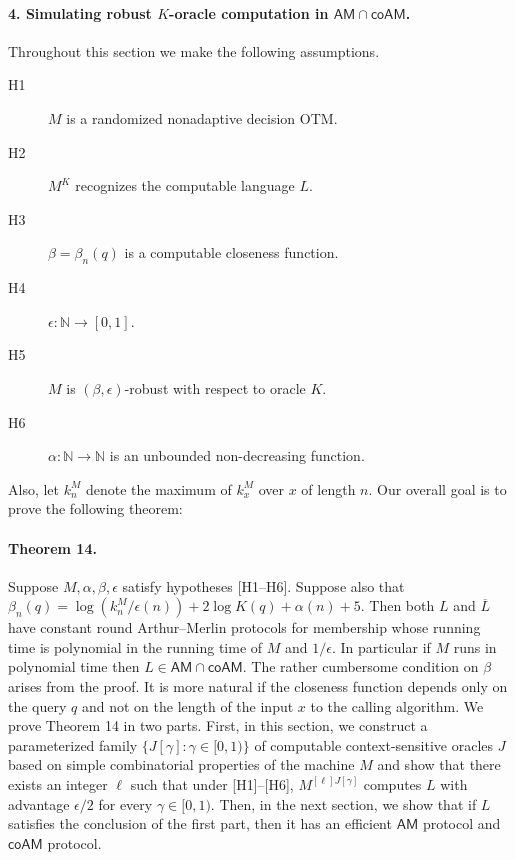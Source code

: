 \paragraph{4. Simulating robust $K$-oracle computation in $\mathsf{AM}\cap\mathsf{coAM}$.}
Throughout this section we make the following assumptions.
\begin{description}
\item[H1] $M$ is a randomized nonadaptive decision OTM.
\item[H2] $M^K$ recognizes the computable language $L$.
\item[H3] $\beta=\beta_n(q)$ is a computable closeness function.
\item[H4] $\epsilon:\mathbb N\to[0,1]$.
\item[H5] $M$ is $(\beta,\epsilon)$-robust with respect to oracle $K$.
\item[H6] $\alpha:\mathbb N\to\mathbb N$ is an unbounded non-decreasing function.
\end{description}
Also, let $k_n^M$ denote the maximum of $k_x^M$ over $x$ of length $n$.
Our overall goal is to prove the following theorem:
\paragraph{Theorem 14.}
Suppose $M,\alpha,\beta,\epsilon$ satisfy hypotheses [H1--H6]. Suppose also that $\beta_n(q)=\log(k_n^M/\epsilon(n))+2\log K(q)+\alpha(n)+5$. Then both $L$ and $\overline L$ have constant round Arthur--Merlin protocols for membership whose running time is polynomial in the running time of $M$ and $1/\epsilon$. In particular if $M$ runs in polynomial time then $L\in\mathsf{AM}\cap\mathsf{coAM}$.
The rather cumbersome condition on $\beta$ arises from the proof. It is more natural if the closeness function depends only on the query $q$ and not on the length of the input $x$ to the calling algorithm.
We prove Theorem 14 in two parts. First, in this section, we construct a parameterized family $\{J[\gamma]:\gamma\in[0,1)\}$ of computable context-sensitive oracles $J$ based on simple combinatorial properties of the machine $M$ and show that there exists an integer $\ell$ such that under [H1]--[H6], $M^{[\ell]J[\gamma]}$ computes $L$ with advantage $\epsilon/2$ for every $\gamma\in[0,1)$.
Then, in the next section, we show that if $L$ satisfies the conclusion of the first part, then it has an efficient $\mathsf{AM}$ protocol and $\mathsf{coAM}$ protocol.
